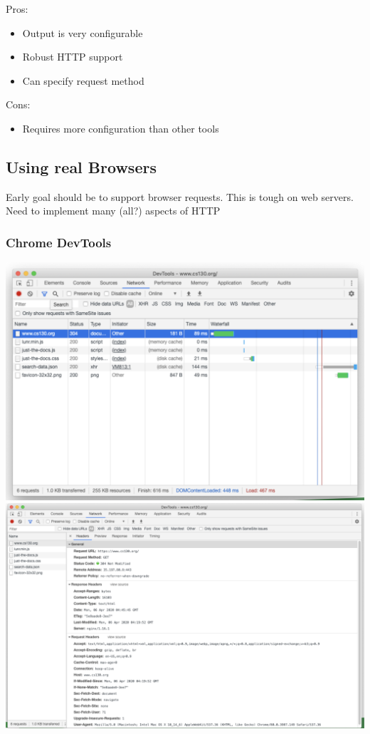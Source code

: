 \documentclass{article}
\begin{document}
Pros:
\begin{itemize}
    \item Output is very configurable
    \item Robust HTTP support
    \item Can specify request method 
\end{itemize}

Cons:
\begin{itemize}
    \item Requires more configuration than other tools
\end{itemize}

\subsection{Using real Browsers}

Early goal should be to support browser requests. This is tough on web servers. Need to implement many (all?) aspects of HTTP

\subsubsection*{Chrome DevTools}
\includegraphics*[width=\linewidth]{chromeDevTools1.png}
\includegraphics*[width=\linewidth]{chromeDevTools2.png}
\end{document}
